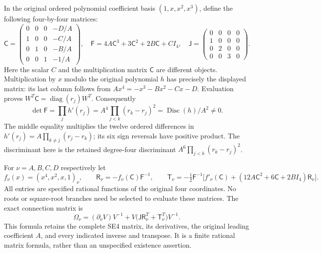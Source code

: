 \documentclass[11pt]{article}
\begin{document}
In the original ordered polynomial coefficient basis $(1,x,x^2,x^3)$,
define the following four-by-four matrices:
\[
 \mathsf C=\begin{pmatrix}
 0&0&0&-D/A\\1&0&0&-C/A\\0&1&0&-B/A\\0&0&1&-1/A
 \end{pmatrix},\quad
 \mathsf F=4A\mathsf C^3+3\mathsf C^2+2B\mathsf C+CI_4,
 \quad
 \mathsf J=\begin{pmatrix}0&0&0&0\\1&0&0&0\\0&2&0&0\\0&0&3&0\end{pmatrix}.
 \tag{SC2}
\]
Here the scalar $C$ and the multiplication matrix $\mathsf C$ are
different objects. Multiplication by $x$ modulo the original polynomial
$h$ has precisely the displayed matrix: its last column follows from
$Ax^4=-x^3-Bx^2-Cx-D$. Evaluation proves
$W^T\mathsf C=\operatorname{diag}(r_j)W^T$. Consequently
\[
 \det\mathsf F=\prod_jh'(r_j)
   =A^4\prod_{j<k}(r_k-r_j)^2
   =\operatorname{Disc}(h)/A^2\ne0.
 \tag{SC3}
\]
The middle equality multiplies the twelve ordered differences in
$h'(r_j)=A\prod_{k\ne j}(r_j-r_k)$; its six sign reversals have
positive product. The discriminant here is the retained degree-four
discriminant $A^6\prod_{j<k}(r_k-r_j)^2$.

For $\nu=A,B,C,D$ respectively let
\[
 f_\nu(x)=(x^4,x^2,x,1)_\nu,\qquad
 \mathsf R_\nu=-f_\nu(\mathsf C)\mathsf F^{-1},\qquad
 \mathsf T_\nu=-\tfrac12\mathsf F^{-1}
 \bigl[f'_\nu(\mathsf C)
 +(12A\mathsf C^2+6\mathsf C+2BI_4)\mathsf R_\nu\bigr].
 \tag{SC4}
\]
All entries are specified rational functions of the original four
coordinates. No roots or square-root branches need be selected to
evaluate these matrices. The exact connection matrix is
\[
 \boxed{\quad
 \Omega_\nu=(\partial_\nu V)V^{-1}
       +V\bigl(\mathsf J\mathsf R_\nu^T+
                           \mathsf T_\nu^T\bigr)V^{-1}.
 \quad} \tag{SC5}
\]
This formula retains the complete SE4 matrix, its derivatives, the
original leading coefficient $A$, and every indicated inverse and
transpose. It is a finite rational matrix formula, rather than an
unspecified existence assertion.
\end{document}
